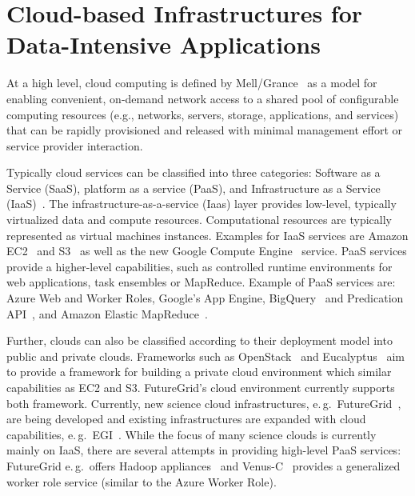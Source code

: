\documentclass[times]{cpeauth}
\begin{document}
\section{Cloud-based Infrastructures for Data-Intensive Applications}

At a high level, cloud computing is defined by Mell/Grance~\cite{nist_cloud}
as a model for enabling convenient, on-demand network access to a shared pool
of configurable computing resources (e.g., networks, servers, storage,
applications, and services) that can be rapidly provisioned and released with
minimal management effort or service provider interaction.


Typically cloud services can be classified into three categories: Software as
a Service (SaaS), platform as a service (PaaS), and Infrastructure as a
Service (IaaS)~\cite{Jha:2010kx}. The infrastructure-as-a-service (Iaas) layer
provides low-level, typically virtualized data and compute resources.
Computational resources are typically represented as virtual machines
instances. Examples for IaaS services are Amazon EC2~\cite{amazon_ec2} and
S3~\cite{amazons3} as well as the new Google Compute Engine~\cite{gce}
service. PaaS services provide a higher-level capabilities, such as controlled
runtime environments for web applications, task ensembles or MapReduce.
Example of PaaS services are: Azure Web and Worker Roles, Google's App Engine,
BigQuery~\cite{google-bigquery} and Predication
API~\cite{google-predication-api}, and Amazon Elastic
MapReduce~\cite{amazonemr}.


% 


Further, clouds can also be classified according to their deployment model
into public and private clouds. Frameworks such as OpenStack~\cite{openstack}
and Eucalyptus~\cite{euca} aim to provide a framework for building a private
cloud environment which similar capabilities as EC2 and S3. FutureGrid's cloud
environment currently supports both framework. Currently, new science cloud
infrastructures, e.\,g.\ FutureGrid~\cite{futuregrid}, are being developed and
existing infrastructures are expanded with cloud capabilities, e.\,g.\
EGI~\cite{egi-cloud}. While the focus of many science clouds is currently
mainly on IaaS, there are several attempts in providing high-level PaaS
services: FutureGrid e.\,g.\ offers Hadoop appliances~\cite{2016793} and
Venus-C~\cite{venusc-generic-worker} provides a generalized worker role
service (similar to the Azure Worker Role).
\end{document}
